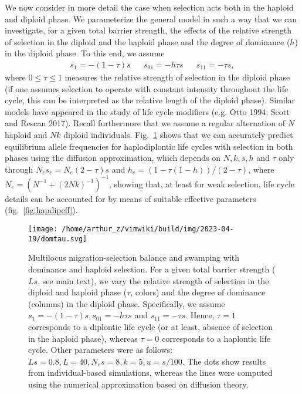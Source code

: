 \documentclass[
  11pt,
]{article}
\begin{document}
We now consider in more detail the case when selection acts both in the
haploid and diploid phase. We parameterize the general model in such a
way that we can investigate, for a given total barrier strength, the
effects of the relative strength of selection in the diploid and the
haploid phase and the degree of dominance (\(h\)) in the diploid phase.
To this end, we assume \begin{align}
   s_1 = -(1-\tau)s & & s_{01} = -h\tau s & & s_{11} = -\tau s,
   \label{eq:hapdipmodel}
\end{align} where \(0 \le \tau \le 1\) measures the relative strength of
selection in the diploid phase (if one assumes selection to operate with
constant intensity throughout the life cycle, this can be interpreted as
the relative length of the diploid phase). Similar models have appeared
in the study of life cycle modifiers (e.g. Otto 1994; Scott and Rescan
2017). Recall furthermore that we assume a regular alternation of \(N\)
haploid and \(Nk\) diploid individuals. Fig.~\ref{fig:domtau} shows that
we can accurately predict equilibrium allele frequencies for
haplodiplontic life cycles with selection in both phases using the
diffusion approximation, which depends on \(N, k, s, h\) and \(\tau\)
only through \(N_es_e = N_e(2-\tau)s\) and
\(h_e = (1 - \tau(1-h))/(2-\tau)\), where
\(N_e = (N^{-1} + (2Nk)^{-1})^{-1}\), showing that, at least for weak
selection, life cycle details can be accounted for by means of suitable
effective parameters (fig.~\ref{fig:hapdipeff}).

\begin{figure}
\hypertarget{fig:domtau}{%
\centering
\texttt{[image: /home/arthur\_z/vimwiki/build/img/2023-04-19/domtau.svg]}
\caption{Multilocus migration-selection balance and swamping with
dominance and haploid selection. For a given total barrier strength
(\(Ls\), see main text), we vary the relative strength of selection in
the diploid and haploid phase (\(\tau\), colors) and the degree of
dominance (columns) in the diploid phase. Specifically, we assume
\(s_1 = -(1-\tau)s, s_{01} = -h\tau s\) and \(s_{11} = -\tau s\). Hence,
\(\tau = 1\) corresponds to a diplontic life cycle (or at least, absence
of selection in the haploid phase), whereas \(\tau=0\) corresponds to a
haplontic life cycle. Other parameters were as follows:
\(Ls =0.8, L=40, N_es=8, k=5, u=s/100\). The dots show results from
individual-based simulations, whereas the lines were computed using the
numerical approximation based on diffusion theory.}\label{fig:domtau}
}
\end{figure}
\end{document}
